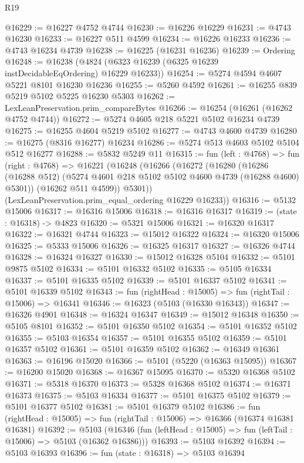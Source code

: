 \begin{lexlean}{R19}
\begin{coremodule}
{{{{{{{{{{{@16229 := @16227 @4752 @4744
@16230 := @16226 @16229
@16231 := @4743 @16230
@16233 := @16227 @511 @4599
@16234 := @16226 @16233
@16236 := @4743 @16234 @4739
@16238 := @16225 (@16231 @16236)
@16239 := Ordering
@16248 := @16238 (@4824 (@6323 @16239 (@6325 @16239 instDecidableEqOrdering) @16229 @16233))
@16254 := @5274 @4594 @4607 @5221 @8101 @16230 @16236
@16255 := @5260 @4592
@16261 := @16255 @839 @5219 @5102 @5225 @16230 @5303
@16262 := LexLeanPreservation.prim_compareBytes
@16266 := @16254 (@16261 (@16262 @4752 @4744))
@16272 := @5274 @4605 @218 @5221 @5102 @16234 @4739
@16275 := @16255 @4604 @5219 @5102
@16277 := @4743 @4600 @4739
@16280 := @16275 (@8316 @16277) @16234
@16286 := @5274 @513 @4603 @5102 @5104 @512 @16277
@16288 := @5832 @5249 @11
@16315 := fun (left : @4768) =>
  fun (right : @4768) =>
  @16221
    (@16248
      (@16266
        (@16272
          (@16280
            (@16286 (@16288 @512) (@5274 @4601 @218 @5102 @5102 @4600 @4739 (@16288 @4600) @5301))
            (@16262 @511 @4599))
          @5301))
      (LexLeanPreservation.prim_equal_ordering @16229 @16233))
@16316 := @5132 @15006
@16317 := @16316 @15006
@16318 := @16316 @16317
@16319 := (state : @16318) -> @4823
@16320 := @5321 @15006
@16321 := @16320 @16317
@16322 := @16321 @4744
@16323 := @15012 @16322
@16324 := @16320 @15006
@16325 := @5333 @15006
@16326 := @16325 @16317
@16327 := @16326 @4744
@16328 := @16324 @16327
@16330 := @15012 @16328 @5104
@16332 := @5101 @9875 @5102
@16334 := @5101 @16332 @5102
@16335 := @5105 @16334
@16337 := @5101 @16335 @5102
@16339 := @5101 @16337 @5102
@16341 := @5101 @16339 @5102
@16343 := fun (rightHead : @15005) => fun (rightTail : @15006) => @16341
@16346 := @16323 (@5103 (@16330 @16343))
@16347 := @16326 @4901
@16348 := @16324 @16347
@16349 := @15012 @16348
@16350 := @5105 @8101
@16352 := @5101 @16350 @5102
@16354 := @5101 @16352 @5102
@16355 := @5103 @16354
@16357 := @5101 @16355 @5102
@16359 := @5101 @16357 @5102
@16361 := @5101 @16359 @5102
@16362 := @16349 @16361
@16363 := @16196 @15020
@16366 := @5101 (@5220 (@16363 @15095))
@16367 := @16200 @15020
@16368 := @16367 @15095
@16370 := @5320 @16368 @5102
@16371 := @5318 @16370
@16373 := @5328 @16368 @5102
@16374 := @16371 @16373
@16375 := @5103 @16334
@16377 := @5101 @16375 @5102
@16379 := @5101 @16377 @5102
@16381 := @5101 @16379 @5102
@16386 := fun (rightHead : @15005) => fun (rightTail : @15006) => @16366 (@16374 @16381 @16381)
@16392 := @5103
    (@16346 (fun (leftHead : @15005) => fun (leftTail : @15006) => @5103 (@16362 @16386)))
@16393 := @5103 @16392
@16394 := @5103 @16393
@16396 := fun (state : @16318) => @5103 @16394
}}}}}}}}}}}
\end{coremodule}
\end{lexlean}
